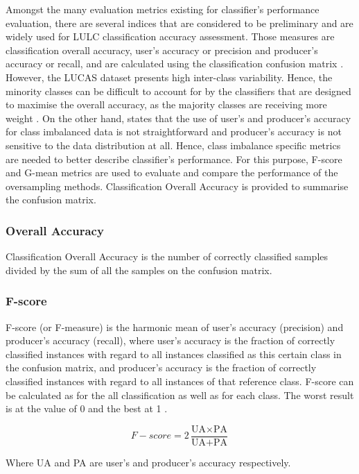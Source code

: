 \documentclass[parskip=full]{scrartcl}
\begin{document}
Amongst the many evaluation metrics existing for classifier's performance
evaluation, there are several indices that are considered to be preliminary and
are widely used for LULC classification accuracy assessment. Those measures are
classification overall accuracy, user's accuracy or precision and
producer's accuracy or recall,  and are calculated using the classification
confusion matrix \cite{Liu2007}. However, the LUCAS dataset presents high
inter-class variability. Hence, the minority classes can be difficult to
account for by the classifiers that are designed to maximise the overall
accuracy, as the majority classes are receiving more weight \cite{Inglada2017}.
On the other hand, \cite{He2008} states that the use of user's and producer's
accuracy for class imbalanced data is not straightforward and producer's
accuracy is not sensitive to the data distribution at all. Hence, class
imbalance specific metrics are needed to better describe classifier's
performance. For this purpose, F-score and G-mean metrics are used to evaluate
and compare the performance of the oversampling methods. Classification Overall
Accuracy is provided to summarise the confusion matrix.


\subsubsection{Overall Accuracy}

Classification Overall Accuracy is the number of correctly classified samples
divided by the sum of all the samples on the confusion matrix.

\subsubsection{F-score}

F-score (or F-measure) is the harmonic mean of user's accuracy (precision) and
producer's accuracy (recall), where user's accuracy is the fraction of correctly
classified instances with regard to all instances classified as this certain
class in the confusion matrix, and producer's accuracy is the fraction of
correctly classified instances with regard to all instances of that reference
class. F-score can be calculated as for the all classification as well as for
each class. The worst result is at the value of 0 and the best at 1
\cite{Inglada2017}.

\[
F{-}score=2\frac{\text{UA} \times \text{PA}}{\text{UA} + \text{PA}}
\]

Where UA and PA are user's and producer's accuracy respectively.
\end{document}

